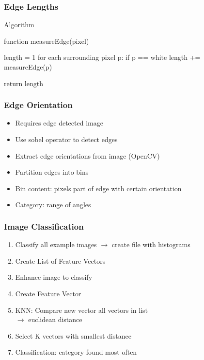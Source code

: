 \documentclass{beamer}
\begin{document}
\begin{frame}[fragile]
	\frametitle{Edge Lengths}
	\begin{block}{Algorithm}
		\begin{verbatimtab}[4]
function measureEdge(pixel) {
	length = 1
	for each surrounding pixel p:
		if p == white
			length += measureEdge(p)
	
	return length
}
		\end{verbatimtab}
	\end{block}
\end{frame}

\begin{frame}
	\frametitle{Edge Orientation}
	\begin{itemize}
		\item Requires edge detected image
		\item Use sobel operator to detect edges
		\item Extract edge orientations from image (OpenCV)
		\item Partition edges into bins
		\item Bin content: pixels part of edge with certain orientation
		\item Category: range of angles
	\end{itemize}
	
	
\end{frame}

\begin{frame}
	\frametitle{Image Classification}
	\begin{enumerate}
		\item Classify all example images $\rightarrow$ create file with histograms
		\item Create List of Feature Vectors
		\item Enhance image to classify
		\item Create Feature Vector
		\item KNN: Compare new vector all vectors in list\\
		$\rightarrow$ euclidean distance\\
		\item Select K vectors with smallest distance
		\item Classification: category found most often
	\end{enumerate}
	
\end{frame}
\end{document}
